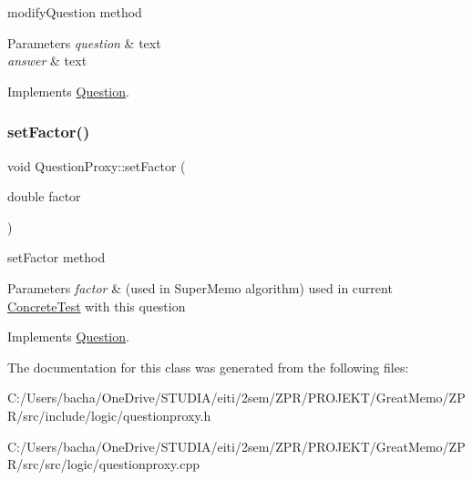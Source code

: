 modify\+Question method 


\begin{DoxyParams}{Parameters}
{\em question} & text \\
\hline
{\em answer} & text \\
\hline
\end{DoxyParams}


Implements \hyperlink{class_question_ae3724056374e2e9160f4d7250241f9ab}{Question}.

\mbox{\label{class_question_proxy_a6993b6a84ebaf916fce21f41b0401fe7}} 
\subsubsection{\texorpdfstring{set\+Factor()}{setFactor()}}
{\footnotesize\ttfamily void Question\+Proxy\+::set\+Factor (\begin{DoxyParamCaption}\item[{double}]{factor }\end{DoxyParamCaption})\hspace{0.3cm}{\ttfamily [virtual]}}



set\+Factor method 


\begin{DoxyParams}{Parameters}
{\em factor} & (used in Super\+Memo algorithm) used in current \hyperlink{class_concrete_test}{Concrete\+Test} with this question \\
\hline
\end{DoxyParams}


Implements \hyperlink{class_question_ad5c8dfa4de5cce04fad3e31c0ccee1a0}{Question}.



The documentation for this class was generated from the following files\+:\begin{DoxyCompactItemize}
\item 
C\+:/\+Users/bacha/\+One\+Drive/\+S\+T\+U\+D\+I\+A/eiti/2sem/\+Z\+P\+R/\+P\+R\+O\+J\+E\+K\+T/\+Great\+Memo/\+Z\+P\+R/src/include/logic/questionproxy.\+h\item 
C\+:/\+Users/bacha/\+One\+Drive/\+S\+T\+U\+D\+I\+A/eiti/2sem/\+Z\+P\+R/\+P\+R\+O\+J\+E\+K\+T/\+Great\+Memo/\+Z\+P\+R/src/src/logic/questionproxy.\+cpp\end{DoxyCompactItemize}
